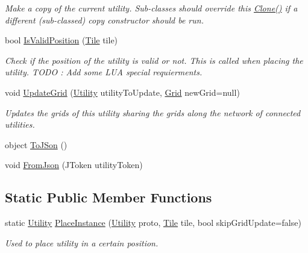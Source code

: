 \begin{DoxyCompactItemize}
\begin{DoxyCompactList}\small\item\em Make a copy of the current utility. Sub-\/classes should override this \hyperlink{class_utility_a54de483d7822530b229a0456780fcc6f}{Clone()} if a different (sub-\/classed) copy constructor should be run. \end{DoxyCompactList}\item 
bool \hyperlink{class_utility_a1b84a54773d5d229afc911c4f1bdb66d}{Is\+Valid\+Position} (\hyperlink{class_tile}{Tile} tile)
\begin{DoxyCompactList}\small\item\em Check if the position of the utility is valid or not. This is called when placing the utility. T\+O\+DO \+: Add some L\+UA special requierments. \end{DoxyCompactList}\item 
void \hyperlink{class_utility_aef8d5581e49a8841dbd15f9d0f6b6c3c}{Update\+Grid} (\hyperlink{class_utility}{Utility} utility\+To\+Update, \hyperlink{class_project_porcupine_1_1_power_network_1_1_grid}{Grid} new\+Grid=null)
\begin{DoxyCompactList}\small\item\em Updates the grids of this utility sharing the grids along the network of connected utilities. \end{DoxyCompactList}\item 
object \hyperlink{class_utility_a958b42276dab1f260988a4104a948fd6}{To\+J\+Son} ()
\item 
void \hyperlink{class_utility_aaf08054a8528db9736f7d8dcdc78105e}{From\+Json} (J\+Token utility\+Token)
\end{DoxyCompactItemize}
\subsection*{Static Public Member Functions}
\begin{DoxyCompactItemize}
\item 
static \hyperlink{class_utility}{Utility} \hyperlink{class_utility_a6eac11c367b9574de78f3aacb159513a}{Place\+Instance} (\hyperlink{class_utility}{Utility} proto, \hyperlink{class_tile}{Tile} tile, bool skip\+Grid\+Update=false)
\begin{DoxyCompactList}\small\item\em Used to place utility in a certain position. \end{DoxyCompactList}\end{DoxyCompactItemize}
